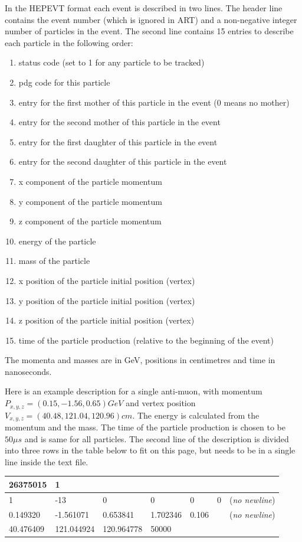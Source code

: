 \documentclass[12pt]{article}
\begin{document}
In the HEPEVT format each event is described in two lines. The header line contains the event number (which is ignored in ART) and a non-negative integer number of particles in the event. The second line contains 15 entries to describe each particle in the following order:
\begin{enumerate}
\item status code (set to 1 for any particle to be tracked)
\item pdg code for this particle
\item entry for the first mother of this particle in the event (0 means no mother)
\item entry for the second mother of this particle in the event
\item entry for the first daughter of this particle in the event
\item entry for the second daughter of this particle in the event
\item x component of the particle momentum 
\item y component of the particle momentum
\item z component of the particle momentum
\item energy of the particle
\item mass of the particle
\item x position of the particle initial position (vertex)
\item y position of the particle initial position (vertex)
\item z position of the particle initial position (vertex)
\item time of the particle production (relative to the beginning of the event)
\end{enumerate}

The momenta and masses are in GeV, positions in centimetres and time in nanoseconds.

Here is an example description for a single anti-muon, with momentum $P_{x,y,z}=\left(0.15, -1.56, 0.65\right)\unit{GeV}$ and vertex position $V_{x,y,z}=\left(40.48,121.04,120.96\right)\unit{cm}$. The energy is calculated from the momentum and the mass. The time of the particle production is chosen to be $50\unit{\mu s}$  and is same for all particles. The second line of the description is divided into three rows in the table below to fit on this page, but needs to be in a single line inside the text file.

\begin{center}
\begin{tabular}{llllllr}\hline
26375015 & 1 & & & & &\\ \hline
1 & -13 & 0 & 0 & 0 & 0 & (\textit{no newline})\\ 0.149320 & -1.561071 & 0.653841 & 1.702346 & 0.106 & & (\textit{no newline})\\ 40.476409 & 121.044924 & 120.964778 & 50000 & & &\\\hline
\end{tabular}
\end{center}
\end{document}
